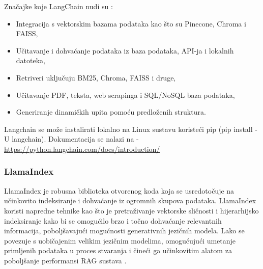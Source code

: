\documentclass[]{foi}
\begin{document}
Značajke koje LangChain nudi su \cite{novogroder2025ragtools}:
\begin{itemize}
    \item Integracija s vektorskim bazama podataka kao što su Pinecone, Chroma i FAISS,
    \item Učitavanje i dohvaćanje podataka iz baza podataka, API-ja i lokalnih datoteka,
    \item Retriveri uključuju BM25, Chroma, FAISS i druge,
    \item Učitavanje PDF, teksta, web scrapinga i SQL/NoSQL baza podataka,
    \item Generiranje dinamičkih upita pomoću predloženih struktura.
\end{itemize}

Langchain se može instalirati lokalno na Linux sustavu koristeći pip (pip install -U langchain). Dokumentacija se nalazi na - \url{https://python.langchain.com/docs/introduction/} 


\subsubsection{LlamaIndex}
LlamaIndex je robusna biblioteka otvorenog koda koja se usredotočuje na učinkovito indeksiranje i dohvaćanje iz ogromnih skupova podataka. 
LlamaIndex koristi napredne tehnike kao što je pretraživanje vektorske sličnosti i hijerarhijsko indeksiranje kako bi se omogućilo brzo i 
točno dohvaćanje relevantnih informacija, poboljšavajući mogućnosti generativnih jezičnih modela. Lako se povezuje s uobičajenim 
velikim jezičnim modelima, omogućujući umetanje primljenih podataka u proces stvaranja i čineći ga učinkovitim alatom za poboljšanje performansi 
RAG sustava \cite{novogroder2025ragtools}.
\end{document}
